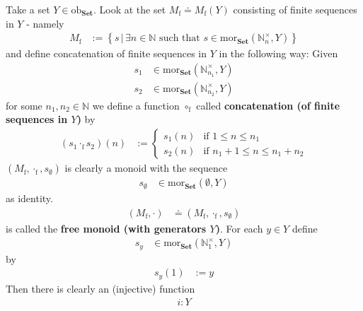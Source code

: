 \begin{exa}
\label{exa:freemon}
Take a set $Y \in \mathrm{ob}_{\mathbf{Set}}$.
Look at the set $M_{\textrm{f}} \doteq M_{\textrm{f}}(Y)$ consisting of finite sequences in $Y$ - namely
\begin{align*}
  M_{\textrm{f}}
  &:=
  \left\lbrace
      s
    \,
    \vert
    \,
      \exists
      n
      \in
      \mathbb{N}
      \text{ such that }
      s
      \in
      \mathrm{mor}_{\mathbf{Set}}(\mathbb{N}_{n}^{\times},Y)
  \right\rbrace
\end{align*}
and define concatenation of finite sequences in $Y$ in the following way: Given
\begin{align*}
  s_{1}
  &\in
  \mathrm{mor}_{\mathbf{Set}}(\mathbb{N}_{n_{1}}^{\times},Y)
  \\
  s_{2}
  &\in
  \mathrm{mor}_{\mathbf{Set}}(\mathbb{N}_{n_{2}}^{\times},Y)
\end{align*}
for some $n_{1},n_{2} \in \mathbb{N}$ we define a function $\circ_{\textrm{f}}$ called \textbf{concatenation (of finite sequences in $Y$)} by
\begin{align*}
  \left(
    s_{1}
    \cdot_{\textrm{f}}
    s_{2}
  \right)
  (n)
  &:=
  \begin{cases}
    s_{1}(n)
    &
    \text{if }
    1
    \leq
    n
    \leq
    n_{1}
    \\
    s_{2}(n)
    &
    \text{if }
    n_{1}
    +
    1
    \leq
    n
    \leq
    n_{1}
    +
    n_{2}
  \end{cases}
\end{align*}
$(M_{\textrm{f}},\cdot_{\textrm{f}},s_{\emptyset})$ is clearly a monoid with the sequence
\begin{align*}
  s_{\emptyset}
  &\in
  \mathrm{mor}_{\mathbf{Set}}(\emptyset,Y)
\end{align*}
as identity.
\begin{align*}
  (M_{\textrm{f}},\cdot)
  &\doteq
  (M_{\textrm{f}},\cdot_{\textrm{f}},s_{\emptyset})
\end{align*}
is called the \textbf{free monoid (with generators $Y$)}.
For each $y \in Y$ define
\begin{align*}
  s_{y}
  &\in
  \mathrm{mor}_{\mathbf{Set}}(\mathbb{N}_{1}^{\times},Y)
\end{align*}
by
\begin{align*}
  s_{y}(1)
  &:=
  y
\end{align*}
Then there is clearly an (injective) function
\begin{align*}
  i
  \colon
  Y

\end{align*}
\end{exa}
